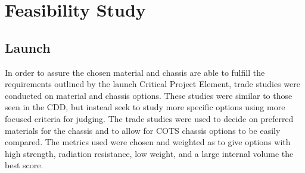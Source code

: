 
\section{Feasibility Study}

\subsection{Launch}
In order to assure the chosen material and chassis are able to fulfill the requirements outlined by the launch Critical Project Element, trade studies were conducted on material and chassis options. These studies were similar to those seen in the CDD, but instead seek to study more specific options using more focused criteria for judging. The trade studies were used to decide on preferred materials for the chassis and to allow for COTS chassis options to be easily compared. The metrics used were chosen and weighted as to give options with high strength, radiation resistance, low weight, and a large internal volume the best score.
